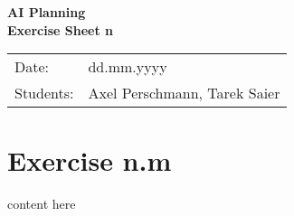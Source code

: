 \documentclass[11pt,a4paper]{article}
\begin{document}
\begin{center}
\Huge{\textbf{AI Planning}}\\
\LARGE{\textbf{Exercise Sheet n}}
\end{center}
\vspace{2cm}
\begin{tabular}{ll}
Date: & dd.mm.yyyy\\
Students: & Axel Perschmann, Tarek Saier
\end{tabular}

\section*{Exercise n.m}
content here
\end{document}
